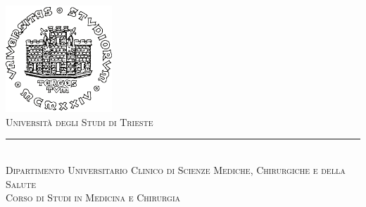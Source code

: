 
\begin{titlepage} %
\null\vfill
\begin{center}
\large
\sffamily
	\newcommand{\HRule}{\rule{\linewidth}{0.5mm}} %
	
	\center %
	
	
	\includegraphics[width=0.3\textwidth]{Figure/logoUniTs.pdf}\\[1cm] %
	 
	
	
	\textsc{\LARGE Universit\`a degli Studi di Trieste}\\
	\HRule\\[0.5cm] %
	
	\textsc{\Large Dipartimento Universitario Clinico di Scienze Mediche, Chirurgiche e della Salute}\\[0.5cm] %
	
	\textsc{\large Corso di Studi in Medicina e Chirurgia}\\[0.5cm] %
	

\end{center}
\end{titlepage}
